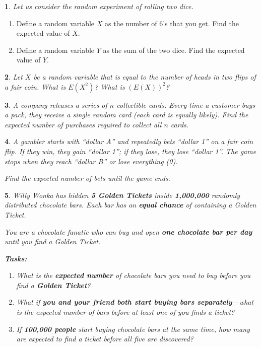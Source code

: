 \documentclass[%
addpoints]{exam}
\theoremstyle{problem}
\newtheorem{p}{}
\begin{document}


\begin{p}
Let us consider the random experiment of rolling two dice.
\hfill \end{p}
\begin{enumerate}
    \item Define a random variable \(X\) as the number of 6's that you get. Find the expected value of \(X\).
    \item Define a random variable \(Y\) as the sum of the two dice. Find the expected value of \(Y\).
\end{enumerate}

\begin{p}
Let \( X \) be a random variable that is equal to the number of heads in two flips of a  
fair coin. What is \( E(X^2) \)? What is \( (E(X))^2 \)?
\hfill \end{p}

\begin{p}
A company releases a series of $n$ collectible cards. Every time a customer buys a pack, they receive a single random card (each card is equally likely). Find the expected number of purchases required to collect all $n$ cards.
\hfill\end{p}

\begin{p}
A gambler starts with ``dollar A'' and repeatedly bets ``dollar 1'' on a fair coin flip. If they win, they gain ``dollar 1''; if they lose, they lose ``dollar 1''. The game stops when they reach ``dollar B'' or lose everything (0). 

Find the expected number of bets until the game ends.
\hfill\end{p}

\begin{p}
Willy Wonka has hidden \textbf{5 Golden Tickets} inside \textbf{1,000,000} randomly distributed chocolate bars. Each bar has an \textbf{equal chance} of containing a Golden Ticket.

You are a chocolate fanatic who can buy and open \textbf{one chocolate bar per day} until you find a Golden Ticket.

\textbf{Tasks:}
\begin{enumerate}
    \item What is the \textbf{expected number} of chocolate bars you need to buy before you find a \textbf{Golden Ticket}?
    \item What if \textbf{you and your friend both start buying bars separately}—what is the expected number of bars before at least one of you finds a ticket?
    \item If \textbf{100,000 people} start buying chocolate bars at the same time, how many are expected to find a ticket before all five are discovered?
\end{enumerate}
\hfill\end{p}
\end{document}
